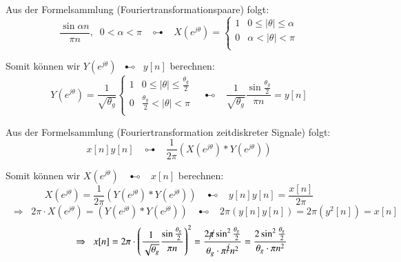 \begin{uebsp}
\begin{Answer}
\begin{enumerate}[a)]
        \begin{uebsp_theory}
            Aus der Formelsammlung (Fouriertransformationspaare) folgt:
            \[\frac{\sin\alpha n}{\pi
                n},\;\;0<\alpha<\pi\;\;\;\multimapdotbothA\;\;\;X\left(e^{j\theta}\right)=
            \begin{cases}
                1& 0\leq|\theta|\leq\alpha\\
                0& \alpha<|\theta|<\pi\\
            \end{cases}\]
        \end{uebsp_theory}
        Somit können wir $Y\left(e^{j\theta}\right)\;\;\multimapdotbothB\;\;y[n]$ berechnen:
            \[Y\left(e^{j\theta}\right)=\frac{1}{\sqrt{\theta_g}}
        \begin{cases}
            1& 0\leq|\theta|\leq\frac{\theta_g}{2}\\
            0& \frac{\theta_g}{2}<|\theta|<\pi\\
    \end{cases}\;\;\;\multimapdotbothB\;\;\;\frac{1}{\sqrt{\theta_g}}\frac{\sin\frac{\theta_g}{2}}{\pi
n}=y[n]\]

        \begin{uebsp_theory}
                Aus der Formelsammlung (Fouriertransformation zeitdiskreter
                Signale) folgt:
                \[x[n]y[n]\;\;\;\multimapdotbothA\;\;\;\frac{1}{2\pi}\left(X\left(e^{j\theta}\right)*Y\left(e^{j\theta}\right)\right)\]
        \end{uebsp_theory}
        Somit können wir
        $X\left(e^{j\theta}\right)\;\;\;\multimapdotbothB\;\;\;x[n]$ berechnen:
        \[X\left(e^{j\theta}\right)=\frac{1}{2\pi}\left(Y\left(e^{j\theta}\right)*Y\left(e^{j\theta}\right)\right)\;\;\;\multimapdotbothB\;\;\;y[n]y[n]=\frac{x[n]}{2\pi}\]
        \[\;\;\Rightarrow\;\;
        2\pi\cdot
    X\left(e^{j\theta}\right)=\left(Y\left(e^{j\theta}\right)*Y\left(e^{j\theta}\right)\right)\;\;\;\multimapdotbothB\;\;\;2\pi\left(y[n]y[n]\right)=2\pi\left(y^2[n]\right)=x[n]\]
        \[\;\;\Rightarrow\;\;x[n]=2\pi\cdot
        \left(\frac{1}{\sqrt{\theta_g}}\frac{\sin\frac{\theta_g}{2}}{\pi
    n}\right)^2=\frac{2\cancel\pi\sin^2\frac{\theta_g}{2}}{\theta_g\cdot\pi^{\cancel{2}}n^2}
        =\frac{2\sin^2\frac{\theta_g}{2}}{\theta_g\cdot\pi n^2}\]


\end{enumerate}
\end{Answer}
\end{uebsp}

